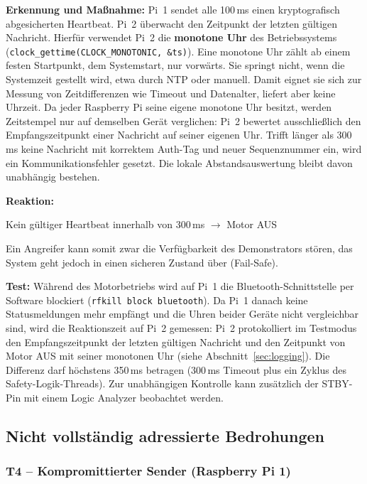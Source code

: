 \textbf{Erkennung und Maßnahme:} Pi~1 sendet alle 100\,ms einen kryptografisch
abgesicherten Heartbeat. Pi~2 überwacht den Zeitpunkt der letzten gültigen Nachricht.
Hierfür verwendet Pi~2 die \textbf{monotone Uhr} des Betriebssystems
(\texttt{clock\_gettime(CLOCK\_MONOTONIC, \&ts)}). Eine monotone Uhr zählt ab einem
festen Startpunkt, dem Systemstart, nur vorwärts. Sie springt nicht, wenn die
Systemzeit gestellt wird, etwa durch NTP oder manuell. Damit eignet sie sich zur
Messung von Zeitdifferenzen wie Timeout und Datenalter, liefert aber keine
Uhrzeit. Da jeder Raspberry Pi seine eigene monotone Uhr besitzt, werden
Zeitstempel nur auf demselben Gerät verglichen: Pi~2 bewertet ausschließlich den
Empfangszeitpunkt einer Nachricht auf seiner eigenen Uhr. Trifft länger als 300\,ms keine
Nachricht mit korrektem Auth-Tag und neuer Sequenznummer ein, wird ein Kommunikationsfehler
gesetzt. Die lokale Abstandsauswertung bleibt davon unabhängig bestehen.

\textbf{Reaktion:}
\begin{center}
    Kein gültiger Heartbeat innerhalb von 300\,ms $\rightarrow$ Motor AUS
\end{center}

Ein Angreifer kann somit zwar die Verfügbarkeit des Demonstrators stören, das
System geht jedoch in einen sicheren Zustand über (Fail-Safe).

\textbf{Test:} Während des Motorbetriebs wird auf Pi~1 die Bluetooth-Schnittstelle
per Software blockiert (\texttt{rfkill block bluetooth}). Da Pi~1 danach keine
Statusmeldungen mehr empfängt und die Uhren beider Geräte nicht vergleichbar
sind, wird die Reaktionszeit auf Pi~2 gemessen: Pi~2 protokolliert im Testmodus
den Empfangszeitpunkt der letzten gültigen Nachricht und den Zeitpunkt von
Motor AUS mit seiner monotonen Uhr (siehe Abschnitt~\ref{sec:logging}). Die
Differenz darf höchstens 350\,ms betragen (300\,ms Timeout plus ein Zyklus des
Safety-Logik-Threads). Zur unabhängigen Kontrolle kann zusätzlich der STBY-Pin
mit einem Logic Analyzer beobachtet werden.

\subsection{Nicht vollständig adressierte Bedrohungen}

\subsubsection*{T4 -- Kompromittierter Sender (Raspberry Pi 1)}

